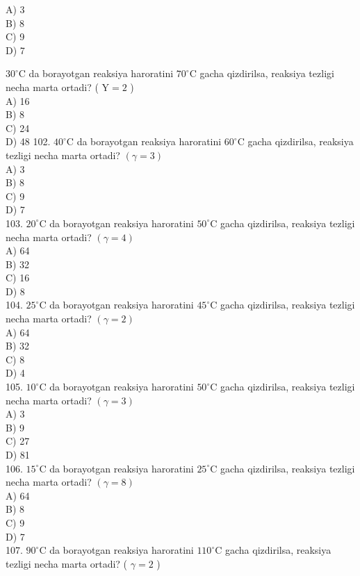 A) 3\\
B) 8\\
C) 9\\
D) 7
  \item $30^{\circ} \mathrm{C}$ da borayotgan reaksiya haroratini $70^{\circ} \mathrm{C}$ gacha qizdirilsa, reaksiya tezligi necha marta ortadi? ( $\mathrm{Y}=2$ )\\
A) 16\\ 
B) 8\\
C) 24\\
D) 48
102. $40^{\circ} \mathrm{C}$ da borayotgan reaksiya haroratini $60^{\circ} \mathrm{C}$ gacha qizdirilsa, reaksiya tezligi necha marta ortadi? $(\gamma=3)$\\
A) 3\\
B) 8\\
C) 9\\
D) 7\\
103. $20^{\circ} \mathrm{C}$ da borayotgan reaksiya haroratini $50^{\circ} \mathrm{C}$ gacha qizdirilsa, reaksiya tezligi necha marta ortadi? $(\gamma=4)$\\
A) 64\\
B) 32\\
C) 16\\
D) 8\\
104. $25^{\circ} \mathrm{C}$ da borayotgan reaksiya haroratini $45^{\circ} \mathrm{C}$ gacha qizdirilsa, reaksiya tezligi necha marta ortadi? $(\gamma=2)$\\
A) 64\\
B) 32\\
C) 8\\
D) 4\\
105. $10^{\circ} \mathrm{C}$ da borayotgan reaksiya haroratini $50^{\circ} \mathrm{C}$ gacha qizdirilsa, reaksiya tezligi necha marta ortadi? $(\gamma=3)$\\
A) 3\\
B) 9\\
C) 27\\
D) 81\\
106. $15^{\circ} \mathrm{C}$ da borayotgan reaksiya haroratini $25^{\circ} \mathrm{C}$ gacha qizdirilsa, reaksiya tezligi necha marta ortadi? $(\gamma=8)$\\
A) 64\\
B) 8\\
C) 9\\
D) 7\\
107. $90^{\circ} \mathrm{C}$ da borayotgan reaksiya haroratini $110^{\circ} \mathrm{C}$ gacha qizdirilsa, reaksiya tezligi necha marta ortadi? ( $\gamma=2$ )\\
